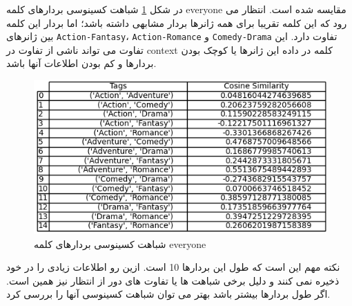 در شکل 
\ref{fig12}
شباهت کسینوسی بردارهای کلمه
everyone
مقایسه شده است. انتظار می رود که این کلمه تقریبا برای همه ژانرها بردار مشابهی داشته باشد؛ اما بردار این کلمه بین ژانرهای 
\texttt{Action-Fantasy}،
\texttt{Action-Romance}
و
\texttt{Comedy-Drama}
تفاوت دارد. این تفاوت می تواند ناشی از تفاوت در context کلمه در داده این ژانرها یا کوچک بودن بردارها و کم بودن اطلاعات آنها باشد.
 \begin{figure}[H]
	\centering
	
	\includegraphics[width=1\textwidth,height=1\textheight,keepaspectratio]{../reports/word2vec/everyone}
	\caption{شباهت کسینوسی بردارهای کلمه everyone}
	\label{fig12}
	
\end{figure} 



نکته مهم این است که طول این بردارها 10 است. ازین رو اطلاعات زیادی را در خود ذخیره نمی کنند و دلیل برخی شباهت ها یا تفاوت های دور از انتظار نیز همین است. اگر طول بردارها بیشتر باشد بهتر می توان شباهت کسینوسی آنها را بررسی کرد.